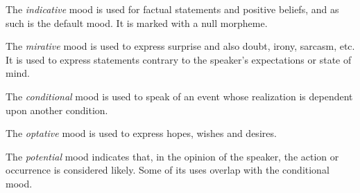 \documentclass[grammar]{subfiles}
\begin{document}
  The \emph{indicative} mood is used for factual statements and positive
  beliefs, and as such is the default mood.  It is marked with a null morpheme. 

  The \emph{mirative} mood is used to express surprise and also doubt, irony,
  sarcasm, etc.  It is used to express statements contrary to the speaker’s
  expectations or state of mind.

  The \emph{conditional} mood is used to speak of an event whose realization is dependent upon another condition. 

  The \emph{optative} mood is used to express hopes, wishes and desires.

  The \emph{potential} mood indicates that, in the opinion of the speaker, the
  action or occurrence is considered likely.  Some of its uses overlap with the
  conditional mood.

%
%
%
%
%
%
\end{document}
